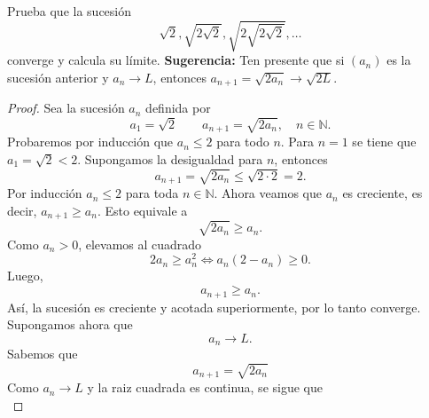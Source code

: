 \documentclass[12pt,a4paper]{article}
\begin{document}
    \begin{mdframed}[style=mdbluebox,frametitle={Ejercicio 8}]
        Prueba que la sucesión
        \begin{equation*}
            \sqrt{2},\sqrt{2\sqrt{2}},\sqrt{2\sqrt{2\sqrt{2}}},\dots
        \end{equation*}
        converge y calcula su límite. \textbf{Sugerencia:} Ten presente que si
        $(a_{n})$ es la sucesión anterior y $a_{n}\to L$, entonces $a_{n+1}=\sqrt{2a_{n}}\to\sqrt{2L}$.
    \end{mdframed}

    \begin{proof}
        Sea la sucesión $a_{n}$ definida por
        \begin{equation*}
            a_{1}=\sqrt{2}\qquad a_{n+1}=\sqrt{2a_{n}},\quad n\in\mathbb{N}.
        \end{equation*}
        Probaremos por inducción que $a_{n}\leq2$ para todo $n$. Para $n=1$ se tiene que
        $a_{1}=\sqrt{2}\lt2$. Supongamos la desigualdad para $n$, entonces
        \begin{equation*}
            a_{n+1}=\sqrt{2a_{n}}\leq\sqrt{2\cdot2}=2.
        \end{equation*}
        Por inducción $a_{n}\leq2$ para toda $n\in\mathbb{N}$. Ahora veamos que
        $a_{n}$ es creciente, es decir, $a_{n+1}\geq a_{n}$. Esto equivale a
        \begin{equation*}
            \sqrt{2a_{n}}\geq a_{n}.
        \end{equation*}
        Como $a_{n}\gt0$, elevamos al cuadrado
        \begin{equation*}
            2a_{n}\geq a_{n}^{2}\Longleftrightarrow a_{n}(2-a_{n})\geq0.
        \end{equation*}
        Luego,
        \begin{equation*}
            a_{n+1}\geq a_{n}.
        \end{equation*}
        Así, la sucesión es creciente y acotada superiormente, por lo tanto
        converge. Supongamos ahora que
        \begin{equation*}
            a_{n}\to L.
        \end{equation*}
        Sabemos que
        \begin{equation*}
            a_{n+1}=\sqrt{2a_{n}}
        \end{equation*}
        Como $a_{n}\to L$ y la raiz cuadrada es continua, se sigue que
        \begin{equation*}

\end{equation*}
\end{proof}
\end{document}
